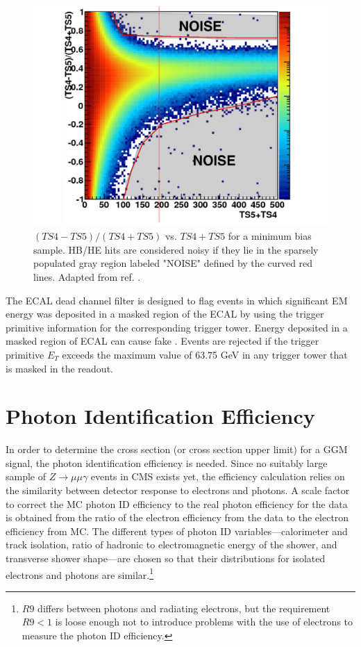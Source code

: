 \documentclass[dissertation.tex]{subfiles}
\begin{document}
\begin{figure}
	\centering
	\includegraphics[scale=0.25]{R45}
	\caption{$(TS4 - TS5)/(TS4 + TS5)$ vs. $TS4 + TS5$ for a minimum bias sample.  HB/HE hits are considered noisy if they lie in the sparsely populated gray region labeled "NOISE" defined by the curved red lines.  Adapted from ref. \cite{Chen}.}
	\label{fig:R45}
\end{figure}

The ECAL dead channel filter is designed to flag events in which significant EM energy was deposited in a masked region of the ECAL by using the trigger primitive information for the corresponding trigger tower.  Energy deposited in a masked region of ECAL can cause fake \MET.  Events are rejected if the trigger primitive $E_{T}$ exceeds the maximum value of 63.75 GeV in any trigger tower that is masked in the readout.

\section{Photon Identification Efficiency}
\label{sec:Photon Identification Efficiency}

In order to determine the cross section (or cross section upper limit) for a GGM signal, the photon identification efficiency is needed.  Since no suitably large sample of $Z\rightarrow\mu\mu\gamma$ events in CMS exists yet, the efficiency calculation relies on the similarity between detector response to electrons and photons.  A scale factor to correct the MC photon ID efficiency to the real photon efficiency for the data is obtained from the ratio of the electron efficiency from the data to the electron efficiency from MC.  \marginpar{\textcolor{blue}{Removed reference to plots}}The different types of photon ID variables---calorimeter and track isolation, ratio of hadronic to electromagnetic energy of the shower, and transverse shower shape---are chosen so that their distributions for isolated electrons and photons are similar.\footnote{$R9$ differs between photons and radiating electrons, but the requirement $R9 < 1$ is loose enough not to introduce problems with the use of electrons to measure the photon ID efficiency.}
\end{document}
